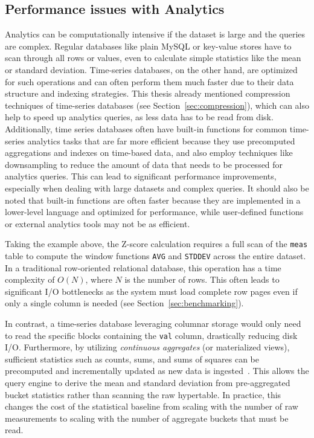 \subsection{Performance issues with Analytics}

Analytics can be computationally intensive if the dataset is large and the
queries are complex. Regular databases like plain MySQL or key-value stores have to
scan through all rows or values, even to calculate simple statistics like the mean
or standard deviation. Time-series databases, on the other hand, are optimized
for such operations and can often perform them much faster due to their data
structure and indexing strategies. This thesis already mentioned compression
techniques of time-series databases (see Section~\ref{sec:compression}), which
can also help to speed up analytics queries, as less data has to be read from
disk. Additionally, time series databases often have built-in functions for
common time-series analytics tasks that are far more efficient because they use
precomputed aggregations and indexes on time-based data, and also employ
techniques like downsampling to reduce the amount of data that needs to be
processed for analytics queries. This can lead to significant performance
improvements, especially when dealing with large datasets and complex queries.
It should also be noted that built-in functions are often faster because they are
implemented in a lower-level language and optimized for performance, while
user-defined functions or external analytics tools may not be as efficient.

Taking the example above, the Z-score calculation requires a full scan of the
\texttt{meas} table to compute the window functions \texttt{AVG} and
\texttt{STDDEV} across the entire dataset. In a traditional row-oriented
relational database, this operation has a time complexity of $O(N)$, where $N$
is the number of rows. This often leads to significant I/O bottlenecks as the
system must load complete row pages even if only a single column is needed (see
Section~\ref{sec:benchmarking}).

In contrast, a time-series database leveraging columnar storage would only need
to read the specific blocks containing the \texttt{val} column, drastically
reducing disk I/O. Furthermore, by utilizing \textit{continuous aggregates} (or
materialized views), sufficient statistics such as counts, sums, and sums of
squares can be precomputed and incrementally updated as new data is
ingested~\cite{TimescaleDB:03}. This allows the query engine to derive the mean
and standard deviation from pre-aggregated bucket statistics rather than
scanning the raw hypertable. In practice, this changes the cost of the
statistical baseline from scaling with the number of raw measurements to
scaling with the number of aggregate buckets that must be read.

